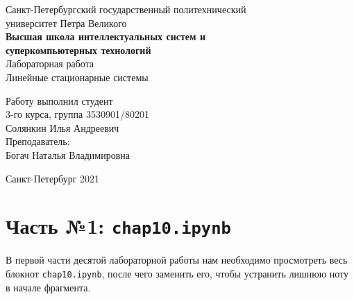 \documentclass[a4paper]{article}
\begin{document}
    \begin{center}
        \begin{center}
        \hfill \break
        \normalsize{Санкт-Петербургский государственный политехнический}\\
        \normalsize{университет Петра Великого}\\
        \hfill \break
        \normalsize{\textbf{Высшая школа интеллектуальных систем и}}\\ 
        \normalsize{\textbf{суперкомпьютерных технологий}}\\ 
        \hfill \break
        \hfill \break
        \hfill \break
        \normalsize{Лабораторная работа}\\
        \hfill \break
        \hfill \break
        \normalsize{\LARGE Линейные стационарные системы}\\
        \end{center}
        \hfill \break
        \hfill \break
        \hfill \break
        \hfill \break
        \hfill \break
        \hfill \break
        \hfill \break
        \hfill \break
        \hfill \break
        \hfill \break
        \begin{flushright}
            \normalsize{Работу выполнил студент}\\
            \normalsize{3-го курса, группа 3530901/80201}\\
            \normalsize{Солянкин Илья Андреевич}\\
            \hfill \break
            \normalsize{Преподаватель:}\\
            \normalsize{Богач Наталья Владимировна}\\
        \end{flushright}
        \hfill \break
        \hfill \break
        \hfill \break
        \hfill \break
        \begin{center} Санкт-Петербург 2021 \end{center}
        \thispagestyle{empty}
    \end{center}
    
    \newpage
        \tableofcontents
    
    \newpage
         \listoffigures
    
    \newpage
         \lstlistoflistings   
     
    \newpage
        \section{Часть №1: \texttt{chap10.ipynb}}
            В первой части десятой лабораторной работы нам необходимо просмотреть весь блокнот \texttt{chap10.ipynb}, после чего заменить его, чтобы устранить лишнюю ноту в начале фрагмента.
            
\end{document}
